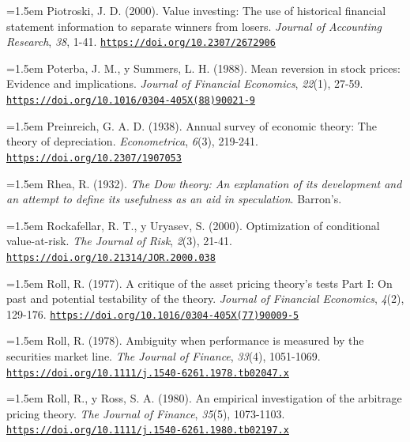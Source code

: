 \documentclass[10pt,a4paper]{article}
\begin{document}
\noindent\hangindent=1.5em Piotroski, J. D. (2000). Value investing: The use of historical financial statement information to separate winners from losers. \textit{Journal of Accounting Research}, \textit{38}, 1-41. \href{https://doi.org/10.2307/2672906}{\nolinkurl{https://doi.org/10.2307/2672906}}

\noindent\hangindent=1.5em Poterba, J. M., y Summers, L. H. (1988). Mean reversion in stock prices: Evidence and implications. \textit{Journal of Financial Economics}, \textit{22}(1), 27-59. \href{https://doi.org/10.1016/0304-405X(88)90021-9}{\nolinkurl{https://doi.org/10.1016/0304-405X(88)90021-9}}

\noindent\hangindent=1.5em Preinreich, G. A. D. (1938). Annual survey of economic theory: The theory of depreciation. \textit{Econometrica}, \textit{6}(3), 219-241. \href{https://doi.org/10.2307/1907053}{\nolinkurl{https://doi.org/10.2307/1907053}}

\noindent\hangindent=1.5em Rhea, R. (1932). \textit{The Dow theory: An explanation of its development and an attempt to define its usefulness as an aid in speculation}. Barron's.

\noindent\hangindent=1.5em Rockafellar, R. T., y Uryasev, S. (2000). Optimization of conditional value-at-risk. \textit{The Journal of Risk}, \textit{2}(3), 21-41. \href{https://doi.org/10.21314/JOR.2000.038}{\nolinkurl{https://doi.org/10.21314/JOR.2000.038}}

\noindent\hangindent=1.5em Roll, R. (1977). A critique of the asset pricing theory's tests Part I: On past and potential testability of the theory. \textit{Journal of Financial Economics}, \textit{4}(2), 129-176. \href{https://doi.org/10.1016/0304-405X(77)90009-5}{\nolinkurl{https://doi.org/10.1016/0304-405X(77)90009-5}}

\noindent\hangindent=1.5em Roll, R. (1978). Ambiguity when performance is measured by the securities market line. \textit{The Journal of Finance}, \textit{33}(4), 1051-1069. \href{https://doi.org/10.1111/j.1540-6261.1978.tb02047.x}{\nolinkurl{https://doi.org/10.1111/j.1540-6261.1978.tb02047.x}}

\noindent\hangindent=1.5em Roll, R., y Ross, S. A. (1980). An empirical investigation of the arbitrage pricing theory. \textit{The Journal of Finance}, \textit{35}(5), 1073-1103. \href{https://doi.org/10.1111/j.1540-6261.1980.tb02197.x}{\nolinkurl{https://doi.org/10.1111/j.1540-6261.1980.tb02197.x}}
\end{document}
